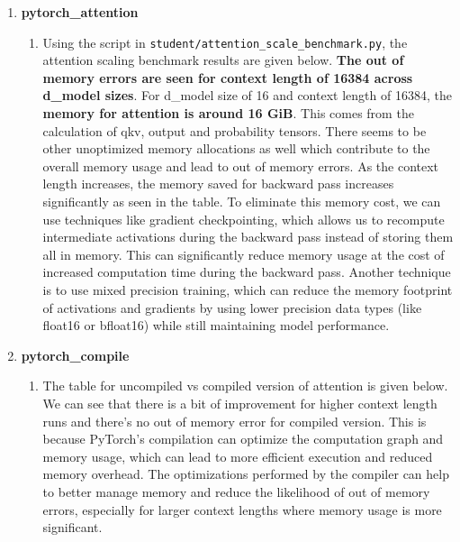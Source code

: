 \documentclass{article}
\begin{document}
\begin{enumerate}[start=1,label=\arabic*.]
\begin{enumerate}
\begin{enumerate}[label=\alph*.]
            \end{enumerate}
        \item [1.2.1] \textbf{pytorch\_attention}
            \begin{enumerate}[label=\alph*.]
                \item Using the script in \texttt{student/attention\_scale\_benchmark.py}, the attention scaling benchmark results are given below. \textbf{The out of memory errors are seen for context length of 16384 across d\_model sizes}. For d\_model size of 16 and context length of 16384, the \textbf{memory for attention is around 16 GiB}. This comes from the calculation of qkv, output and probability tensors. There seems to be other unoptimized memory allocations as well which contribute to the overall memory usage and lead to out of memory errors. As the context length increases, the memory saved for backward pass increases significantly as seen in the table. To eliminate this memory cost, we can use techniques like gradient checkpointing, which allows us to recompute intermediate activations during the backward pass instead of storing them all in memory. This can significantly reduce memory usage at the cost of increased computation time during the backward pass. Another technique is to use mixed precision training, which can reduce the memory footprint of activations and gradients by using lower precision data types (like float16 or bfloat16) while still maintaining model performance.
                    \begin{table}[h]
                        \centering
                    \end{table}
            \end{enumerate}
        \newpage
        \item [1.2.1] \textbf{pytorch\_compile}
            \begin{enumerate}[label=\alph*.]
                \item The table for uncompiled vs compiled version of attention is given below. We can see that there is a bit of improvement for higher context length runs and there's no out of memory error for compiled version. This is because PyTorch's compilation can optimize the computation graph and memory usage, which can lead to more efficient execution and reduced memory overhead. The optimizations performed by the compiler can help to better manage memory and reduce the likelihood of out of memory errors, especially for larger context lengths where memory usage is more significant.

\end{enumerate}
\end{enumerate}
\end{enumerate}
\end{document}
